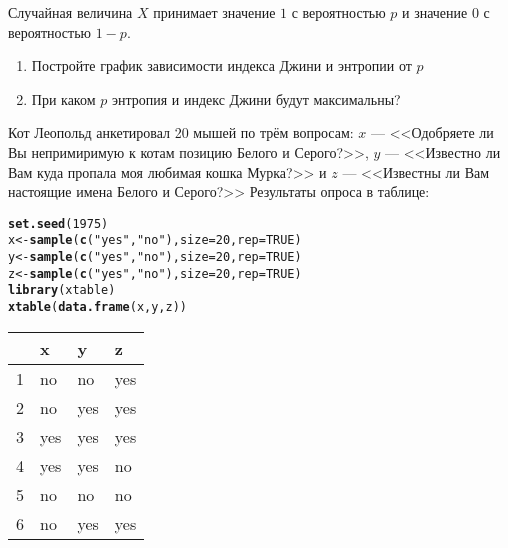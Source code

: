 \documentclass[pdftex,11pt,openany]{book}\usepackage[]{graphicx}\usepackage[]{color}
\makeatletter
\newcommand{\hlnum}[1]{\textcolor[rgb]{0.686,0.059,0.569}{#1}}%
\newcommand{\hlstr}[1]{\textcolor[rgb]{0.192,0.494,0.8}{#1}}%
\newcommand{\hlstd}[1]{\textcolor[rgb]{0.345,0.345,0.345}{#1}}%
\newcommand{\hlkwb}[1]{\textcolor[rgb]{0.69,0.353,0.396}{#1}}%
\newcommand{\hlkwc}[1]{\textcolor[rgb]{0.333,0.667,0.333}{#1}}%
\newcommand{\hlkwd}[1]{\textcolor[rgb]{0.737,0.353,0.396}{\textbf{#1}}}%
\newenvironment{kframe}{%
 \def\at@end@of@kframe{}%
 \ifinner\ifhmode%
  \def\at@end@of@kframe{\end{minipage}}%
  \begin{minipage}{\columnwidth}%
 \fi\fi%
 \def\FrameCommand##1{\hskip\@totalleftmargin \hskip-\fboxsep
 \colorbox{shadecolor}{##1}\hskip-\fboxsep
     \hskip-\linewidth \hskip-\@totalleftmargin \hskip\columnwidth}%
 \MakeFramed {\advance\hsize-\width
   \@totalleftmargin\z@ \linewidth\hsize
   \@setminipage}}%
 {\par\unskip\endMakeFramed%
 \at@end@of@kframe}
\makeatother
\begin{document}
\begin{problem}
Случайная величина $X$ принимает значение $1$ с вероятностью $p$ и значение $0$ с вероятностью $1-p$.
\begin{enumerate}
\item Постройте график зависимости индекса Джини и энтропии от $p$
\item При каком $p$ энтропия и индекс Джини будут максимальны?
\end{enumerate}
\end{problem}

\begin{solution}
\end{solution}


\begin{problem}
Кот Леопольд анкетировал 20 мышей по трём вопросам: $x$ --- <<Одобряете ли Вы непримиримую к котам позицию Белого и Серого?>>, $y$ --- <<Известно ли Вам куда пропала моя любимая кошка Мурка?>> и $z$ --- <<Известны ли Вам настоящие имена Белого и Серого?>> Результаты опроса в таблице:
\begin{kframe}
\begin{alltt}
\hlkwd{set.seed}\hlstd{(}\hlnum{1975}\hlstd{)}
\hlstd{x} \hlkwb{<-} \hlkwd{sample}\hlstd{(}\hlkwd{c}\hlstd{(}\hlstr{"yes"}\hlstd{,}\hlstr{"no"}\hlstd{),}\hlkwc{size}\hlstd{=}\hlnum{20}\hlstd{,}\hlkwc{rep}\hlstd{=}\hlnum{TRUE}\hlstd{)}
\hlstd{y} \hlkwb{<-} \hlkwd{sample}\hlstd{(}\hlkwd{c}\hlstd{(}\hlstr{"yes"}\hlstd{,}\hlstr{"no"}\hlstd{),}\hlkwc{size}\hlstd{=}\hlnum{20}\hlstd{,}\hlkwc{rep}\hlstd{=}\hlnum{TRUE}\hlstd{)}
\hlstd{z} \hlkwb{<-} \hlkwd{sample}\hlstd{(}\hlkwd{c}\hlstd{(}\hlstr{"yes"}\hlstd{,}\hlstr{"no"}\hlstd{),}\hlkwc{size}\hlstd{=}\hlnum{20}\hlstd{,}\hlkwc{rep}\hlstd{=}\hlnum{TRUE}\hlstd{)}
\hlkwd{library}\hlstd{(xtable)}
\hlkwd{xtable}\hlstd{(}\hlkwd{data.frame}\hlstd{(x,y,z))}
\end{alltt}
\end{kframe}%
\begin{table}[ht]
\centering
\begin{tabular}{rlll}
  \hline
 & x & y & z \\ 
  \hline
1 & no & no & yes \\ 
  2 & no & yes & yes \\ 
  3 & yes & yes & yes \\ 
  4 & yes & yes & no \\ 
  5 & no & no & no \\ 
  6 & no & yes & yes \\ 

\end{tabular}
\end{table}
\end{problem}
\end{document}
